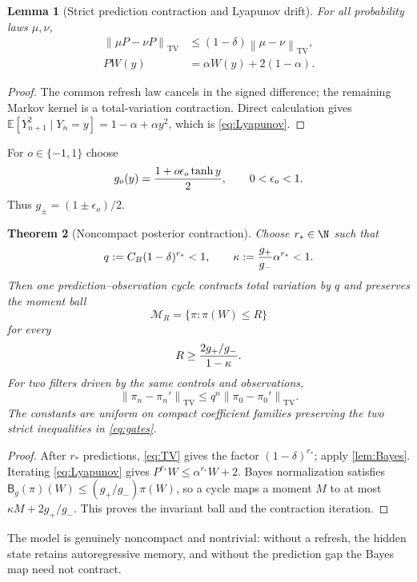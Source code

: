 \documentclass[11pt,reqno]{amsart}
\newtheorem{theorem}{Theorem}[section]
\newtheorem{lemma}[theorem]{Lemma}
\theoremstyle{definition}
\theoremstyle{remark}
\newcommand{\E}{\mathbb E}
\newcommand{\TV}{\mathrm{TV}}
\newcommand{\norm}[1]{\left\lVert #1\right\rVert}
\begin{document}
\begin{lemma}[Strict prediction contraction and Lyapunov drift]\label{lem:drift}
For all probability laws $\mu,\nu$,
\begin{align}
 \norm{\mu P-\nu P}_{\TV}
 &\le(1-\delta)\norm{\mu-\nu}_{\TV},
 \label{eq:TV}\\
 PW(y)&=\alpha W(y)+2(1-\alpha).
 \label{eq:Lyapunov}
\end{align}
\end{lemma}

\begin{proof}
The common refresh law cancels in the signed difference; the remaining Markov
kernel is a total-variation contraction.  Direct calculation gives
$\E[Y_{n+1}^2\mid Y_n=y]=1-\alpha+\alpha y^2$, which is
\eqref{eq:Lyapunov}.
\end{proof}

For $o\in\{-1,1\}$ choose
\begin{equation}\label{eq:obs}
 g_o(y)={1+o\epsilon_o\tanh y\over2},
 \qquad0<\epsilon_o<1.
\end{equation}
Thus $g_\pm=(1\pm\epsilon_o)/2$.

\begin{theorem}[Noncompact posterior contraction]\label{thm:filter}
Choose $r_*\in\N$ such that
\begin{equation}\label{eq:gates}
 q:=C_B(1-\delta)^{r_*}<1,
 \qquad
 \kappa:={g_+\over g_-}\alpha^{r_*}<1.
\end{equation}
Then one prediction--observation cycle contracts total variation by $q$ and
preserves the moment ball
\[
 \mathcal M_R=\{\pi:\pi(W)\le R\}
\]
for every
\[
 R\ge {2g_+/g_-\over1-\kappa}.
\]
For two filters driven by the same controls and observations,
\[
 \norm{\pi_n-\pi_n'}_{\TV}
 \le q^n\norm{\pi_0-\pi_0'}_{\TV}.
\]
The constants are uniform on compact coefficient families preserving the two
strict inequalities in \eqref{eq:gates}.
\end{theorem}

\begin{proof}
After $r_*$ predictions, \eqref{eq:TV} gives the factor
$(1-\delta)^{r_*}$; apply \cref{lem:Bayes}.  Iterating
\eqref{eq:Lyapunov} gives $P^{r_*}W\le\alpha^{r_*}W+2$.  Bayes normalization
satisfies
$\mathsf B_g(\pi)(W)\le(g_+/g_-)\pi(W)$, so a cycle maps a moment $M$ to at
most $\kappa M+2g_+/g_-$.  This proves the invariant ball and the contraction
iteration.
\end{proof}

The model is genuinely noncompact and nontrivial: without a refresh, the
hidden state retains autoregressive memory, and without the prediction gap the
Bayes map need not contract.
\end{document}
